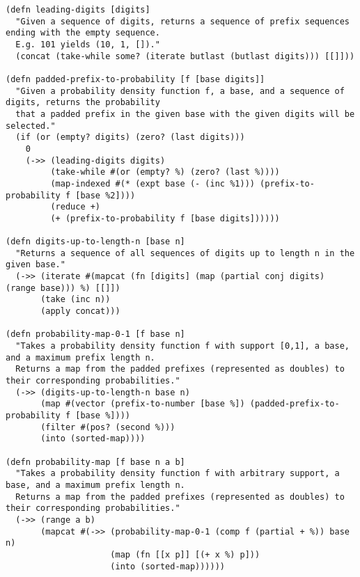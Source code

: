 \begin{lstlisting}[breaklines=true, basicstyle=\small]
(defn leading-digits [digits]
  "Given a sequence of digits, returns a sequence of prefix sequences ending with the empty sequence.
  E.g. 101 yields (10, 1, [])."
  (concat (take-while some? (iterate butlast (butlast digits))) [[]]))

(defn padded-prefix-to-probability [f [base digits]]
  "Given a probability density function f, a base, and a sequence of digits, returns the probability
  that a padded prefix in the given base with the given digits will be selected."
  (if (or (empty? digits) (zero? (last digits)))
    0
    (->> (leading-digits digits)
         (take-while #(or (empty? %) (zero? (last %))))
         (map-indexed #(* (expt base (- (inc %1))) (prefix-to-probability f [base %2])))
         (reduce +)
         (+ (prefix-to-probability f [base digits])))))

(defn digits-up-to-length-n [base n]
  "Returns a sequence of all sequences of digits up to length n in the given base."
  (->> (iterate #(mapcat (fn [digits] (map (partial conj digits) (range base))) %) [[]])
       (take (inc n))
       (apply concat)))

(defn probability-map-0-1 [f base n]
  "Takes a probability density function f with support [0,1], a base, and a maximum prefix length n.
  Returns a map from the padded prefixes (represented as doubles) to their corresponding probabilities."
  (->> (digits-up-to-length-n base n)
       (map #(vector (prefix-to-number [base %]) (padded-prefix-to-probability f [base %])))
       (filter #(pos? (second %)))
       (into (sorted-map))))

(defn probability-map [f base n a b]
  "Takes a probability density function f with arbitrary support, a base, and a maximum prefix length n.
  Returns a map from the padded prefixes (represented as doubles) to their corresponding probabilities."
  (->> (range a b)
       (mapcat #(->> (probability-map-0-1 (comp f (partial + %)) base n)
                     (map (fn [[x p]] [(+ x %) p]))
                     (into (sorted-map))))))
\end{lstlisting}